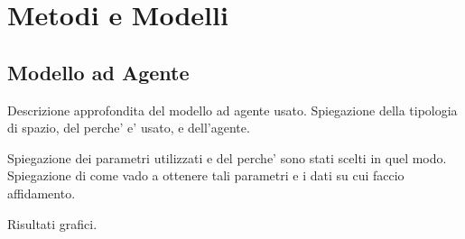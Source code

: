 \section{Metodi e Modelli}

\subsection{Modello ad Agente}

Descrizione approfondita del modello ad agente usato.
Spiegazione della tipologia di spazio, del perche' e' usato, e 
dell'agente. 

Spiegazione dei parametri utilizzati e del perche' sono stati 
scelti in quel modo. Spiegazione di come vado a ottenere tali parametri 
e i dati su cui faccio affidamento.

Risultati grafici.